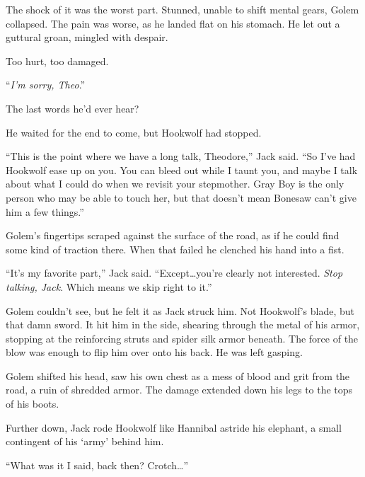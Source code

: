 The shock of it was the worst part.  Stunned, unable to shift mental gears, Golem collapsed.  The pain was worse, as he landed flat on his stomach.  He let out a guttural groan, mingled with despair.



Too hurt, too damaged.



``\emph{I'm sorry, Theo}.''



The last words he'd ever hear?



He waited for the end to come, but Hookwolf had stopped.



``This is the point where we have a long talk, Theodore,'' Jack said.  ``So I've had Hookwolf ease up on you.  You can bleed out while I taunt you, and maybe I talk about what I could do when we revisit your stepmother.  Gray Boy is the only person who may be able to touch her, but that doesn't mean Bonesaw can't give him a few things.''



Golem's fingertips scraped against the surface of the road, as if he could find some kind of traction there.  When that failed he clenched his hand into a fist.



``It's my favorite part,'' Jack said.  ``Except\ldots you're clearly not interested.  \emph{Stop talking, Jack}.  Which means we skip right to it.''



Golem couldn't see, but he felt it as Jack struck him.  Not Hookwolf's blade, but that damn sword.  It hit him in the side, shearing through the metal of his armor, stopping at the reinforcing struts and spider silk armor beneath.  The force of the blow was enough to flip him over onto his back.  He was left gasping.



Golem shifted his head, saw his own chest as a mess of blood and grit from the road, a ruin of shredded armor.  The damage extended down his legs to the tops of his boots.



Further down, Jack rode Hookwolf like Hannibal astride his elephant, a small contingent of his `army' behind him.



``What was it I said, back then?  Crotch\ldots''



